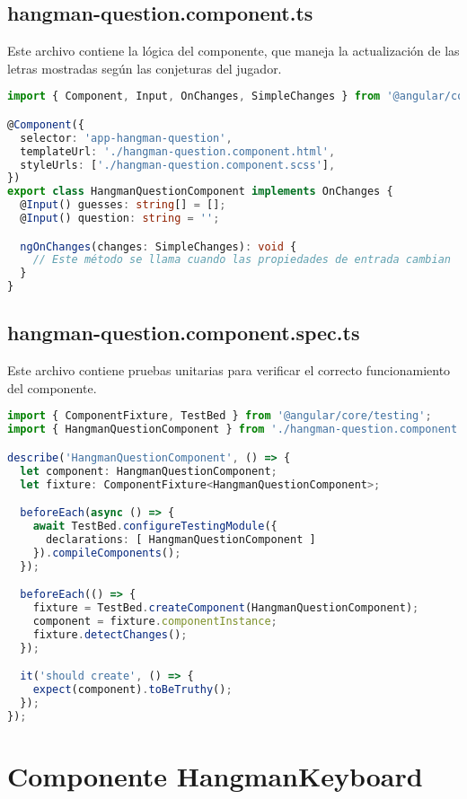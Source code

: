 \subsection{hangman-question.component.ts}

Este archivo contiene la lógica del componente, que maneja la actualización de las letras mostradas según las conjeturas del jugador.

\begin{lstlisting}[language=TypeScript]
import { Component, Input, OnChanges, SimpleChanges } from '@angular/core';

@Component({
  selector: 'app-hangman-question',
  templateUrl: './hangman-question.component.html',
  styleUrls: ['./hangman-question.component.scss'],
})
export class HangmanQuestionComponent implements OnChanges {
  @Input() guesses: string[] = [];
  @Input() question: string = '';

  ngOnChanges(changes: SimpleChanges): void {
    // Este método se llama cuando las propiedades de entrada cambian
  }
}
\end{lstlisting}

\subsection{hangman-question.component.spec.ts}

Este archivo contiene pruebas unitarias para verificar el correcto funcionamiento del componente.

\begin{lstlisting}[language=TypeScript]
import { ComponentFixture, TestBed } from '@angular/core/testing';
import { HangmanQuestionComponent } from './hangman-question.component';

describe('HangmanQuestionComponent', () => {
  let component: HangmanQuestionComponent;
  let fixture: ComponentFixture<HangmanQuestionComponent>;

  beforeEach(async () => {
    await TestBed.configureTestingModule({
      declarations: [ HangmanQuestionComponent ]
    }).compileComponents();
  });

  beforeEach(() => {
    fixture = TestBed.createComponent(HangmanQuestionComponent);
    component = fixture.componentInstance;
    fixture.detectChanges();
  });

  it('should create', () => {
    expect(component).toBeTruthy();
  });
});
\end{lstlisting}

\section{Componente HangmanKeyboard}

